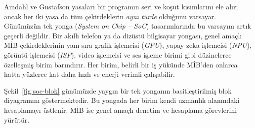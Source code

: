 Amdahl ve Gustafson yasaları bir programın seri ve koşut kısımlarını ele alır; ancak her iki yasa da tüm çekirdeklerin \emph{aynı türde} olduğunu varsayar. Günümüzün tek yonga (\emph{System on Chip -- SoC}) tasarımlarında bu varsayım artık geçerli değildir. Bir akıllı telefon ya da dizüstü bilgisayar yongası, genel amaçlı MİB çekirdeklerinin yanı sıra grafik işlemcisi (\emph{GPU}), yapay zeka işlemcisi (\emph{NPU}), görüntü işlemcisi (\emph{ISP}), video işlemcisi ve ses işleme birimi gibi düzinelerce özelleşmiş birim barındırır. Her birim, belirli bir iş yükünde MİB'den onlarca hatta yüzlerce kat daha hızlı ve enerji verimli çalışabilir.

Şekil~\ref{fig:soc-blok} günümüzde yaygın bir tek yonganın basitleştirilmiş blok diyagramını göstermektedir. Bu yongada her birim kendi uzmanlık alanındaki hesaplamayı üstlenir. MİB ise genel amaçlı denetim ve hesaplama görevlerini yürütür.

